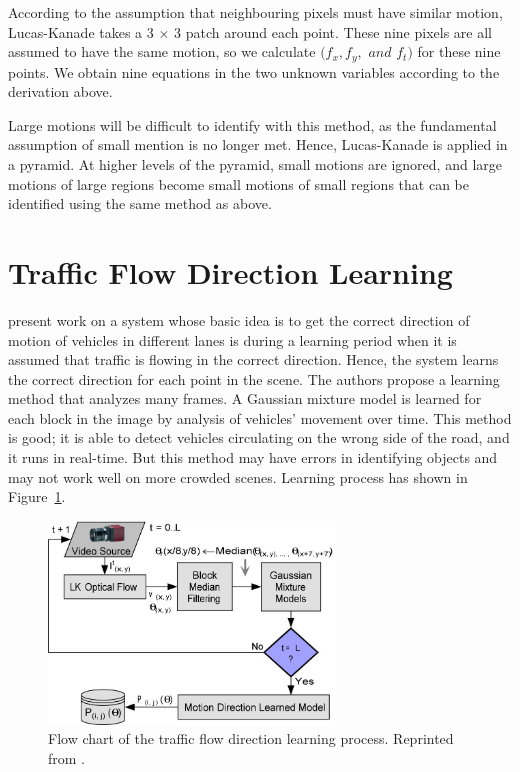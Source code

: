 According to the assumption that neighbouring pixels must have similar motion, Lucas-Kanade takes a 3 $ \times $ 3 patch around each point. These nine pixels are all assumed to have the same motion, so we calculate  $ (f_x,f_y,$ $ and $ $ f_t) $ for these nine points. We obtain nine equations in the two unknown variables according to the derivation above.

Large motions will be difficult to identify with this method, as the fundamental assumption of small mention is no longer met. Hence, Lucas-Kanade is applied in a pyramid. At higher levels of the pyramid, small motions are ignored, and large motions of large regions become small motions of small regions that can be identified using the same method as above.

\section{Traffic Flow Direction Learning}
 present work on a system whose basic idea is to get the correct direction of motion of vehicles in different lanes is during a learning period when it is assumed that traffic is flowing in the correct direction. Hence, the system learns the correct direction for each point in the scene. The authors propose a learning method that analyzes many frames. A Gaussian mixture model is learned for each block in the image by analysis of vehicles' movement over time. This method is good; it is able to detect vehicles circulating on the wrong side of the road, and it runs in real-time. But this method may have errors in identifying objects and may not work well on more crowded scenes. Learning process has shown in Figure~\ref{fig:learning}.
 

\begin{figure}[t]
  \centering
  \includegraphics[width=3in]{figures/learning.jpg}  
  \caption[Learning flow chart]{Flow chart of the traffic flow direction learning process. Reprinted from  . }
  \label{fig:learning}
\end{figure}



